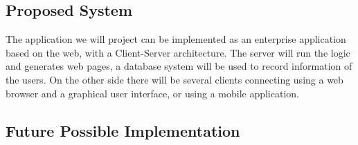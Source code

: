 \subsection{Proposed System}
The application we will project can be implemented as an enterprise application based on the web, with a Client-Server architecture. The server will run the logic and generates web pages, a database system will be used to record information of the users. On the other side there will be several clients connecting using a web browser and a graphical user interface, or using a mobile application.	

\subsection{Future Possible Implementation}
	

	